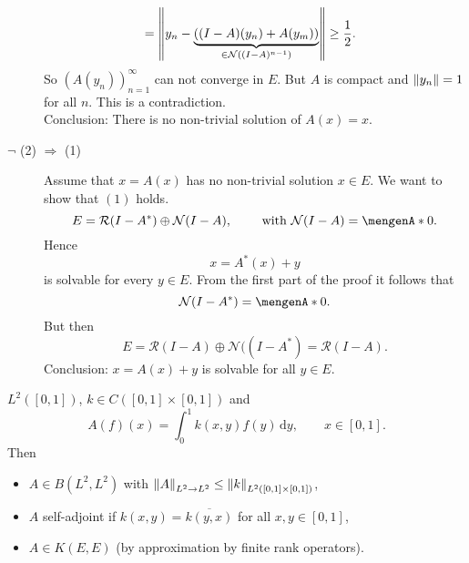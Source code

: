\begin{beweis}
\begin{description}
\begin{align*}
			&=  \norm{y_n - \underset{\in \mathcal{N}((I-A)^{n-1})}{\underbrace{((I-A)(y_n) + A(y_m))}}} \geq \frac{1}{2}.
		\end{align*}
		So $(A(y_n))_{n=1}^{\infty}$ can not converge in $E$. But $A$ is compact and $\norm{y_n}=1$ for all $n$. This is a contradiction. \\
		Conclusion: There is no non-trivial solution of $A(x)=x$.
		\item[$\lnot$ (2) $\Rightarrow$ (1)] Assume that $x = A(x)$ has no non-trivial solution $x \in E$. We want to show that $(1)$ holds.
		\[
			E = \mathcal{R}(I-A^*) \oplus \mathcal{N}(I-A), \qquad \text{ with }\mathcal{N}(I-A) = \set{0}.
		\]
		Hence 
		\[
			x = A^*(x)+y
		\] is solvable for every $y \in E$. From the first part of the proof it follows that 
		\[
			\mathcal{N}(I-A^*) = \set{0}.
		\]
		But then
		\[
			E = \mathcal{R}(I-A) \oplus \mathcal{N}((I-A^*) = \mathcal{R}(I-A).
		\]
		Conclusion: $x = A(x) + y$ is solvable for all $y \in E$.
	\end{description}
\end{beweis}

\begin{beispiel}
	$L^2([0,1])$, $k \in C([0,1] \times [0,1])$ and
	\[
		A(f)(x) = \int_{0}^{1}k(x,y)f(y) \,\mathrm{d}y , \qquad x \in [0,1].
	\]
	Then
	\begin{itemize}
		\item $A \in B(L^2,L^2)$ with $\norm{A}_{L^2 \to L^2} \leq \norm{k}_{L^2([0,1] \times [0,1])}$,
		\item $A$ self-adjoint if $k(x,y) = \overline{k(y,x)}$ for all $x,y \in [0,1]$,
		\item $A \in K(E,E)$ (by approximation by finite rank operators). 
	\end{itemize}
\end{beispiel}

